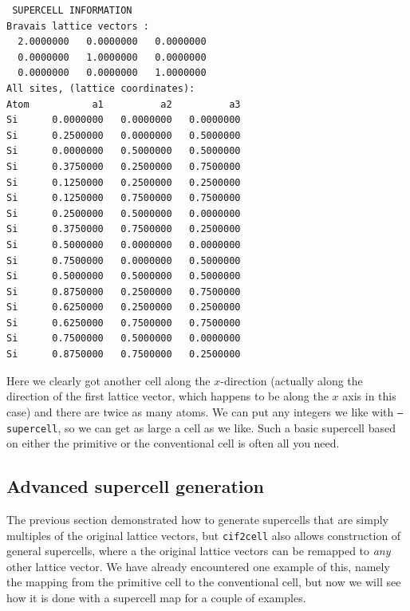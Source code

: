 \documentclass[11pt]{article}
\newcommand{\ciftocell}{\texttt{cif2cell}}
\begin{document}
\begin{verbatim}
 SUPERCELL INFORMATION
Bravais lattice vectors :
  2.0000000   0.0000000   0.0000000 
  0.0000000   1.0000000   0.0000000 
  0.0000000   0.0000000   1.0000000 
All sites, (lattice coordinates):
Atom           a1          a2          a3 
Si      0.0000000   0.0000000   0.0000000
Si      0.2500000   0.0000000   0.5000000
Si      0.0000000   0.5000000   0.5000000
Si      0.3750000   0.2500000   0.7500000
Si      0.1250000   0.2500000   0.2500000
Si      0.1250000   0.7500000   0.7500000
Si      0.2500000   0.5000000   0.0000000
Si      0.3750000   0.7500000   0.2500000
Si      0.5000000   0.0000000   0.0000000
Si      0.7500000   0.0000000   0.5000000
Si      0.5000000   0.5000000   0.5000000
Si      0.8750000   0.2500000   0.7500000
Si      0.6250000   0.2500000   0.2500000
Si      0.6250000   0.7500000   0.7500000
Si      0.7500000   0.5000000   0.0000000
Si      0.8750000   0.7500000   0.2500000
\end{verbatim}

Here we clearly got another cell along the $x$-direction (actually along the direction of the first lattice vector, which happens to be along the $x$ axis in this case) and there are twice as many atoms. We can put any integers we like with \texttt{--supercell}, so we can get as large a cell as we like. Such a basic supercell based on either the primitive or the conventional cell is often all you need.


\subsection{Advanced supercell generation}\label{advancedsupercells}

The previous section demonstrated how to generate supercells that are simply multiples of the original lattice vectors, but \ciftocell{} also allows construction of general supercells, where a the original lattice vectors can be remapped to \emph{any} other lattice vector. We have already encountered one example of this, namely the mapping from the primitive cell to the conventional cell, but now we will see how it is done with a supercell map for a couple of examples.
\end{document}
